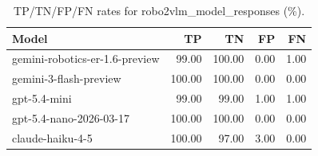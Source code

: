 \begin{table}
\caption{TP/TN/FP/FN rates for robo2vlm_model_responses (\%).}
\label{tab:robo2vlm_model_responses_model_rates}
\begin{tabular}{lrrrr}
\toprule
Model & TP & TN & FP & FN \\
\midrule
gemini-robotics-er-1.6-preview & 99.00 & 100.00 & 0.00 & 1.00 \\
gemini-3-flash-preview & 100.00 & 100.00 & 0.00 & 0.00 \\
gpt-5.4-mini & 99.00 & 99.00 & 1.00 & 1.00 \\
gpt-5.4-nano-2026-03-17 & 100.00 & 100.00 & 0.00 & 0.00 \\
claude-haiku-4-5 & 100.00 & 97.00 & 3.00 & 0.00 \\
\bottomrule
\end{tabular}
\end{table}
